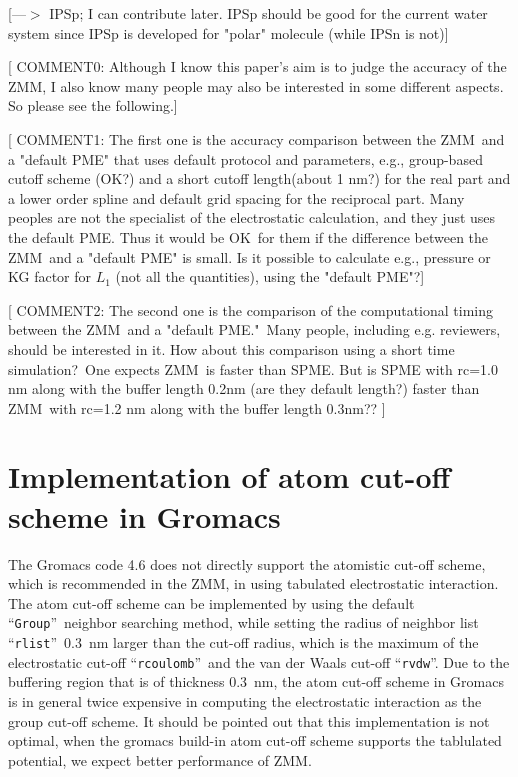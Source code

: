 \documentclass[a4paper,preprint,unsortedaddress,onecolumn,fleqn]{revtex4}
\newcommand{\recheck}[1]{{\color{red} #1}}
\begin{document}
[{\color{blue}---$>$ IPSp; I can contribute later. IPSp should be good for
the current water system since IPSp is developed for "polar" molecule (while
IPSn is not)}]

[ {\color{blue} COMMENT0: Although I know this paper's aim is to judge the
accuracy of the ZMM, I also know many people may also be interested in some
different aspects. So please see the following.}]

[ {\color{blue} COMMENT1: The first one is the accuracy comparison between
the ZMM\ and a "default PME" that uses default protocol and parameters, e.g.,
group-based cutoff scheme (OK?) and a short cutoff length(about 1 nm?) for
the real part and a lower order spline and default grid spacing for the
reciprocal part. Many peoples are not the specialist of the electrostatic
calculation, and they just uses the default PME. Thus it would be OK\ for
them if the difference between the ZMM\ and a "default PME" is small. Is it
possible to calculate e.g., pressure or KG factor for {$L_{1}$} (n{ot all
the quantities}), using the {"default PME"?}}]

[ {\color{blue} COMMENT2: The second one is the comparison of the
computational timing between the ZMM\ and a "default PME."\ Many people,
including e.g. reviewers, should be interested in it. How about this
comparison using a short time simulation?\ One expects ZMM\ is faster than
SPME. But is SPME with rc=1.0 nm along with the buffer length 0.2nm (are
they default length?) faster than ZMM\ with rc=1.2 nm along with the buffer
length 0.3nm?? }]


\appendix

\section{Implementation of atom cut-off scheme in Gromacs}

\label{app:cut-off}

The Gromacs code 4.6 does not directly support the atomistic cut-off scheme, 
{\color{blue}which is recommended in the ZMM, in }using tabulated
electrostatic interaction. The atom cut-off scheme can be implemented by
using the default \textquotedblleft \texttt{Group}\textquotedblright\
neighbor searching method, while setting the radius of neighbor list
\textquotedblleft \texttt{rlist}\textquotedblright\ 0.3~nm larger than the
cut-off radius, which is the maximum of the electrostatic cut-off
\textquotedblleft \texttt{rcoulomb}\textquotedblright\ and the van der Waals
cut-off \textquotedblleft \texttt{rvdw}\textquotedblright . Due to the
buffering region that is of thickness 0.3~nm, the atom cut-off scheme in
Gromacs is in general \recheck{twice} expensive \recheck{in computing the electrostatic interaction} as the group cut-off scheme.
\recheck{It should be pointed out that this implementation is not optimal,
  when the gromacs build-in atom cut-off scheme supports the tablulated potential, we expect better performance of ZMM.}
\end{document}
